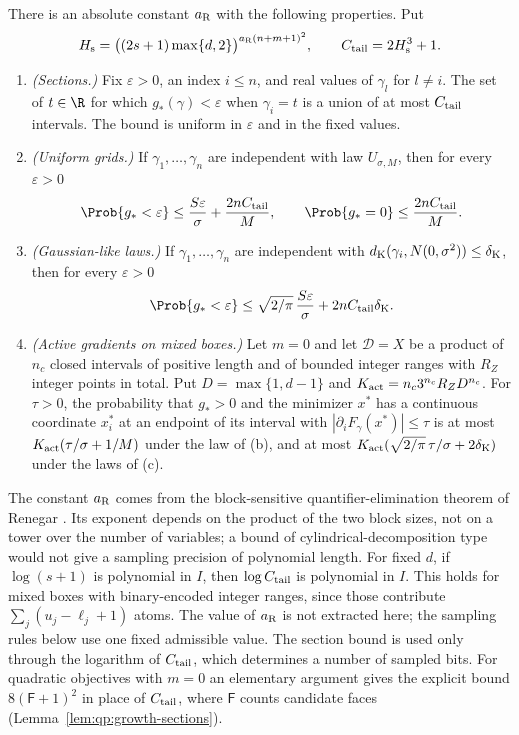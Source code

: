 \begin{lemma}\label{lem:count:finite-tails}
There is an absolute constant $a_{\rm R}$ with the following properties. Put
\[
 H_{\rm s}=\bigl((2s+1)\max\{d,2\}\bigr)^{a_{\rm R}(n+m+1)^2},
 \qquad
 C_{\rm tail}=2H_{\rm s}^3+1 .
\]
\begin{enumerate}[label=(\alph*)]
\item \emph{(Sections.)} Fix $\varepsilon>0$, an index $i\le n$, and real
 values of $\gamma_l$ for $l\ne i$. The set of $t\in\R$ for which
 $g_*(\gamma)<\varepsilon$ when $\gamma_i=t$ is a union of at most
 $C_{\rm tail}$ intervals. The bound is uniform in $\varepsilon$ and in the
 fixed values.
\item \emph{(Uniform grids.)} If $\gamma_1,\dots,\gamma_n$ are independent
 with law $U_{\sigma,M}$, then for every $\varepsilon>0$
 \[
  \Prob\{g_*<\varepsilon\}\le\frac{S\varepsilon}{\sigma}+\frac{2nC_{\rm tail}}M,
  \qquad
  \Prob\{g_*=0\}\le\frac{2nC_{\rm tail}}M .
 \]
\item \emph{(Gaussian-like laws.)} If $\gamma_1,\dots,\gamma_n$ are
 independent with $d_{\rm K}(\gamma_i,N(0,\sigma^2))\le\delta_{\rm K}$, then
 for every $\varepsilon>0$
 \[
  \Prob\{g_*<\varepsilon\}\le\sqrt{2/\pi}\,\frac{S\varepsilon}{\sigma}
  +2nC_{\rm tail}\delta_{\rm K}.
 \]
\item \emph{(Active gradients on mixed boxes.)} Let $m=0$ and let
 $\mathcal D=X$ be a product of $n_c$ closed intervals of positive length
 and of bounded integer ranges with $R_Z$ integer points in total. Put
 $D=\max\{1,d-1\}$ and $K_{\rm act}=n_c3^{n_c}R_ZD^{n_c}$. For $\tau>0$, the
 probability that $g_*>0$ and the minimizer $x^*$ has a continuous
 coordinate $x_i^*$ at an endpoint of its interval with
 $|\partial_iF_\gamma(x^*)|\le\tau$ is at most
 $K_{\rm act}(\tau/\sigma+1/M)$ under the law of (b), and at most
 $K_{\rm act}(\sqrt{2/\pi}\,\tau/\sigma+2\delta_{\rm K})$ under the laws
 of (c).
\end{enumerate}
\end{lemma}

The constant $a_{\rm R}$ comes from the block-sensitive quantifier-elimination
theorem of Renegar \cite{renegar1992-on-the-computational-complexity-and}.
Its exponent depends on the product of the two block sizes, not on a tower
over the number of variables; a bound of cylindrical-decomposition type would
not give a sampling precision of polynomial length. For fixed $d$, if
$\log(s+1)$ is polynomial in $I$, then $\log C_{\rm tail}$ is polynomial in
$I$. This holds for mixed boxes with binary-encoded integer ranges, since
those contribute $\sum_j(u_j-\ell_j+1)$ atoms. The value of $a_{\rm R}$ is not
extracted here; the sampling rules below use one fixed admissible value. The
section bound is used only through the logarithm of $C_{\rm tail}$, which
determines a number of sampled bits. For quadratic objectives with $m=0$ an
elementary argument gives the explicit bound $8(\mathsf F+1)^2$ in place of
$C_{\rm tail}$, where $\mathsf F$ counts candidate faces
(Lemma~\ref{lem:qp:growth-sections}).

